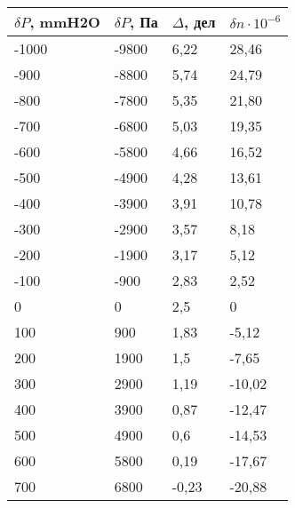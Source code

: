 \begin{table}[H]
	\centering
	\begin{tabular}{|l|l|l|l|}
		\hline
		$\delta P$, mmH2O & $\delta P$, Па & $\Delta$, дел & $\delta n \cdot 10^{-6}$ \\ \hline
		-1000             & -9800          & 6,22          & 28,46                    \\ \hline
		-900              & -8800          & 5,74          & 24,79                    \\ \hline
		-800              & -7800          & 5,35          & 21,80                    \\ \hline
		-700              & -6800          & 5,03          & 19,35                    \\ \hline
		-600              & -5800          & 4,66          & 16,52                    \\ \hline
		-500              & -4900          & 4,28          & 13,61                    \\ \hline
		-400              & -3900          & 3,91          & 10,78                    \\ \hline
		-300              & -2900          & 3,57          & 8,18                     \\ \hline
		-200              & -1900          & 3,17          & 5,12                     \\ \hline
		-100              & -900           & 2,83          & 2,52                     \\ \hline
		0                 & 0              & 2,5           & 0                        \\ \hline
		100               & 900            & 1,83          & -5,12                    \\ \hline
		200               & 1900           & 1,5           & -7,65                    \\ \hline
		300               & 2900           & 1,19          & -10,02                   \\ \hline
		400               & 3900           & 0,87          & -12,47                   \\ \hline
		500               & 4900           & 0,6           & -14,53                   \\ \hline
		600               & 5800           & 0,19          & -17,67                   \\ \hline
		700               & 6800           & -0,23         & -20,88                   \\ \hline
	\end{tabular}
\end{table}

